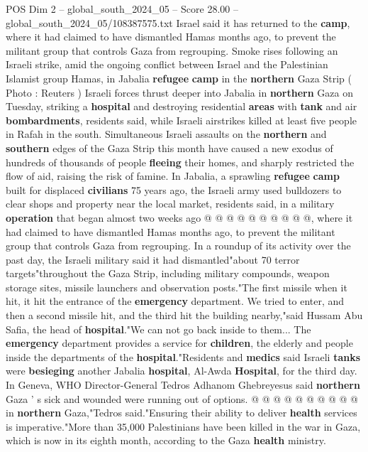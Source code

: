 \begin{textsample}{POS Dim 2 – global\_south\_2024\_05 – Score 28.00 – global\_south\_2024\_05/108387575.txt}  \label{ex:f2_pos_078}
Israel said it has returned to the \textbf{camp}, where it had claimed to have dismantled Hamas months ago, to prevent the militant group that controls Gaza from regrouping.
Smoke rises following an Israeli strike, amid the ongoing conflict between Israel and the Palestinian Islamist group Hamas, in Jabalia \textbf{refugee} \textbf{camp} in the \textbf{northern} Gaza Strip ( Photo : Reuters ) Israeli forces thrust deeper into Jabalia in \textbf{northern} Gaza on Tuesday, striking a \textbf{hospital} and destroying residential \textbf{areas} with \textbf{tank} and air \textbf{bombardments}, residents said, while Israeli airstrikes killed at least five people in Rafah in the south.
Simultaneous Israeli assaults on the \textbf{northern} and \textbf{southern} edges of the Gaza Strip this month have caused a new exodus of hundreds of thousands of people \textbf{fleeing} their homes, and sharply restricted the flow of aid, raising the risk of famine.
In Jabalia, a sprawling \textbf{refugee} \textbf{camp} built for displaced \textbf{civilians} 75 years ago, the Israeli army used bulldozers to clear shops and property near the local market, residents said, in a military \textbf{operation} that began almost two weeks ago @ @ @ @ @ @ @ @ @ @, where it had claimed to have dismantled Hamas months ago, to prevent the militant group that controls Gaza from regrouping.
In a roundup of its activity over the past day, the Israeli military said it had dismantled"about 70 terror targets"throughout the Gaza Strip, including military compounds, weapon storage sites, missile launchers and observation posts."The first missile when it hit, it hit the entrance of the \textbf{emergency} department.
We tried to enter, and then a second missile hit, and the third hit the building nearby,"said Hussam Abu Safia, the head of \textbf{hospital}."We can not go back inside to them...
The \textbf{emergency} department provides a service for \textbf{children}, the elderly and people inside the departments of the \textbf{hospital}."Residents and \textbf{medics} said Israeli \textbf{tanks} were \textbf{besieging} another Jabalia \textbf{hospital}, Al-Awda \textbf{Hospital}, for the third day.
In Geneva, WHO Director-General Tedros Adhanom Ghebreyesus said \textbf{northern} Gaza ' s sick and wounded were running out of options. @ @ @ @ @ @ @ @ @ @ in \textbf{northern} Gaza,"Tedros said."Ensuring their ability to deliver \textbf{health} services is imperative."More than 35,000 Palestinians have been killed in the war in Gaza, which is now in its eighth month, according to the Gaza \textbf{health} ministry.

\end{textsample}
